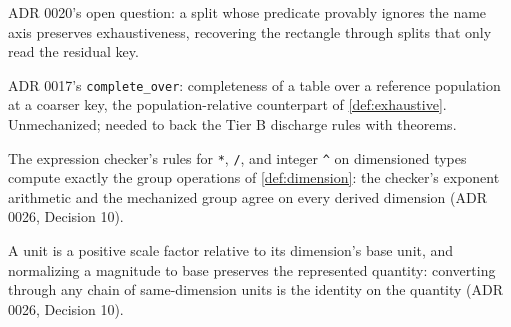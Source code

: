 \begin{theorem}
  \label{thm:split-exhaustive-axis-blind}
  ADR 0020's open question: a split whose predicate provably ignores the
  name axis preserves exhaustiveness, recovering the rectangle through
  splits that only read the residual key.
\end{theorem}

\begin{definition}
  \label{def:complete-over} %
  ADR 0017's \texttt{complete\_over}: completeness of a table over a
  reference population at a coarser key, the population-relative
  counterpart of \ref{def:exhaustive}.  Unmechanized; needed to back the
  Tier B discharge rules with theorems.
\end{definition}

\begin{theorem}
  \label{thm:dimension-arith-sound}
  The expression checker's rules for \texttt{*}, \texttt{/}, and integer
  \texttt{\^{}} on dimensioned types compute exactly the group operations
  of \ref{def:dimension}: the checker's exponent arithmetic and the
  mechanized group agree on every derived dimension (ADR 0026,
  Decision 10).
\end{theorem}

\begin{theorem}
  \label{thm:unit-conversion-correct}
  A unit is a positive scale factor relative to its dimension's base
  unit, and normalizing a magnitude to base preserves the represented
  quantity: converting through any chain of same-dimension units is the
  identity on the quantity (ADR 0026, Decision 10).
\end{theorem}
